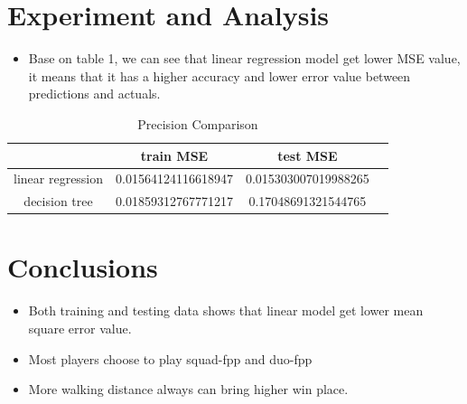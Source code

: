 

\section{Experiment and Analysis} \label{sec-experiment}
\begin{itemize}
  \item Base on table 1, we can see that linear regression model get lower MSE value, 
  it means that it has a higher accuracy and lower error value between predictions and actuals.
\end{itemize}

\begin{table}  \centering
  \caption{Precision Comparison}
  \label{tbl:overall-experiments}
  \begin{tabular}{cccc}
\toprule
     & train MSE & test MSE \\
\midrule
    linear regression & 0.01564124116618947 & 0.015303007019988265
    \\
    decision tree & 0.01859312767771217 & 0.17048691321544765 \\
\bottomrule
\end{tabular}
\end{table}


\section{Conclusions} \label{sec-conclusions}
\begin{itemize}
  \item Both training and testing data shows that linear model get lower mean square error
  value.
  \item Most players choose to play squad-fpp and duo-fpp
  \item More walking distance always can bring higher win place.
\end{itemize}





